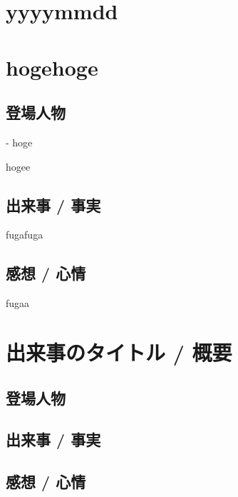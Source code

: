 \section*{yyyymmdd}

\setcounter{section}{0}

\section{hogehoge}

\subsection{登場人物}

- hoge

hogee

\subsection{出来事 / 事実}

fugafuga

\subsection{感想 / 心情}

fugaa

\section{出来事のタイトル / 概要}

\subsection{登場人物}

\subsection{出来事 / 事実}

\subsection{感想 / 心情}
